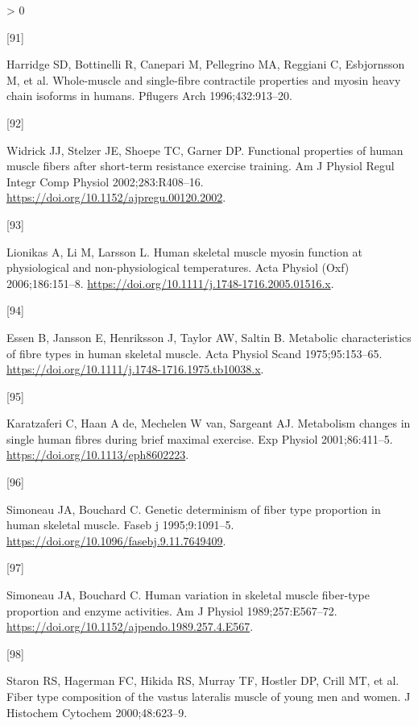 \documentclass[twoside,10pt]{gihclass} %
\newlength{\cslhangindent}
\newlength{\csllabelwidth}
\newenvironment{CSLReferences}[3] %
 {%
  \setlength{\parindent}{0pt}
  \ifodd #1 \everypar{\setlength{\hangindent}{\cslhangindent}}\ignorespaces\fi
  \ifnum #2 > 0
  \setlength{\parskip}{#2\baselineskip}
  \fi
 }%
 {}
\newcommand{\CSLLeftMargin}[1]{\parbox[t]{\maxof{\widthof{#1}}{\csllabelwidth}}{#1}}
\newcommand{\CSLRightInline}[1]{\parbox[t]{\linewidth}{#1}}
\begin{document}
\begin{CSLReferences}{0}{0}
\leavevmode\hypertarget{ref-RN846}{}%
\CSLLeftMargin{{[}91{]} }
\CSLRightInline{Harridge SD, Bottinelli R, Canepari M, Pellegrino MA, Reggiani C, Esbjornsson M, et al. Whole-muscle and single-fibre contractile properties and myosin heavy chain isoforms in humans. Pflugers Arch 1996;432:913--20.}

\leavevmode\hypertarget{ref-RN2169}{}%
\CSLLeftMargin{{[}92{]} }
\CSLRightInline{Widrick JJ, Stelzer JE, Shoepe TC, Garner DP. Functional properties of human muscle fibers after short-term resistance exercise training. Am J Physiol Regul Integr Comp Physiol 2002;283:R408--16. \url{https://doi.org/10.1152/ajpregu.00120.2002}.}

\leavevmode\hypertarget{ref-RN849}{}%
\CSLLeftMargin{{[}93{]} }
\CSLRightInline{Lionikas A, Li M, Larsson L. Human skeletal muscle myosin function at physiological and non-physiological temperatures. Acta Physiol (Oxf) 2006;186:151--8. \url{https://doi.org/10.1111/j.1748-1716.2005.01516.x}.}

\leavevmode\hypertarget{ref-RN1885}{}%
\CSLLeftMargin{{[}94{]} }
\CSLRightInline{Essen B, Jansson E, Henriksson J, Taylor AW, Saltin B. Metabolic characteristics of fibre types in human skeletal muscle. Acta Physiol Scand 1975;95:153--65. \url{https://doi.org/10.1111/j.1748-1716.1975.tb10038.x}.}

\leavevmode\hypertarget{ref-RN2801}{}%
\CSLLeftMargin{{[}95{]} }
\CSLRightInline{Karatzaferi C, Haan A de, Mechelen W van, Sargeant AJ. Metabolism changes in single human fibres during brief maximal exercise. Exp Physiol 2001;86:411--5. \url{https://doi.org/10.1113/eph8602223}.}

\leavevmode\hypertarget{ref-RN2798}{}%
\CSLLeftMargin{{[}96{]} }
\CSLRightInline{Simoneau JA, Bouchard C. Genetic determinism of fiber type proportion in human skeletal muscle. Faseb j 1995;9:1091--5. \url{https://doi.org/10.1096/fasebj.9.11.7649409}.}

\leavevmode\hypertarget{ref-RN2795}{}%
\CSLLeftMargin{{[}97{]} }
\CSLRightInline{Simoneau JA, Bouchard C. Human variation in skeletal muscle fiber-type proportion and enzyme activities. Am J Physiol 1989;257:E567--72. \url{https://doi.org/10.1152/ajpendo.1989.257.4.E567}.}

\leavevmode\hypertarget{ref-RN285}{}%
\CSLLeftMargin{{[}98{]} }
\CSLRightInline{Staron RS, Hagerman FC, Hikida RS, Murray TF, Hostler DP, Crill MT, et al. Fiber type composition of the vastus lateralis muscle of young men and women. J Histochem Cytochem 2000;48:623--9.}


\end{CSLReferences}
\end{document}
